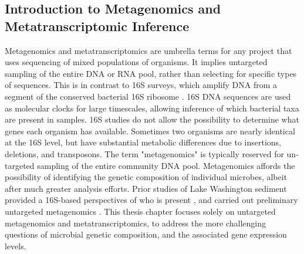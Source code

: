 \subsection{Introduction to Metagenomics and Metatranscriptomic Inference}
Metagenomics and metatranscriptomics are umbrella terms for any project that uses sequencing of mixed populations of organisms.
It implies untargeted sampling of the entire DNA or RNA pool, rather than selecting for specific types of sequences.
This is in contrast to 16S surveys, which amplify DNA from a segment of the conserved bacterial 16S ribosome \cite{kunin2008}.
16S DNA sequences are used as molecular clocks for large timescales, allowing inference of which bacterial taxa are present in samples.
16S studies do not allow the possibility to determine what genes each organism has available.
Sometimes two organisms are nearly identical at the 16S level, but have substantial metabolic differences due to insertions, deletions, and transposons.  %
The term "metagenomics" is typically reserved for un-targeted sampling of the entire community DNA pool.
Metagenomics affords the possibility of identifying the genetic composition of individual microbes, albeit after much greater analysis efforts.
Prior studies of Lake Washington sediment provided a 16S-based perspectives of who is present \cite{beck2013LW, hernandez2015LW, oshkin2015LW}, and carried out preliminary untargeted metagenomics \cite{beck2013LW, oshkin2015LW}.
This thesis chapter focuses solely on untargeted metagenomics and metatranscriptomics, to address the more challenging questions of microbial genetic composition, and the associated gene expression levels. %

